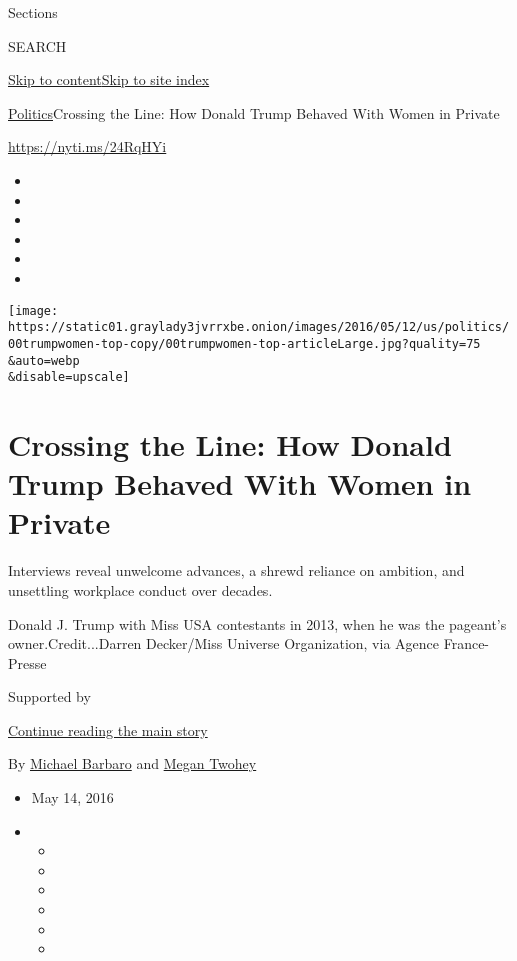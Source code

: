 Sections

SEARCH

\protect\hyperlink{site-content}{Skip to
content}\protect\hyperlink{site-index}{Skip to site index}

\href{/section/politics}{Politics}\textbar{}Crossing the Line: How
Donald Trump Behaved With Women in Private

\url{https://nyti.ms/24RqHYi}

\begin{itemize}
\item
\item
\item
\item
\item
\item
\end{itemize}

\texttt{[image: https://static01.graylady3jvrrxbe.onion/images/2016/05/12/us/politics/00trumpwomen-top-copy/00trumpwomen-top-articleLarge.jpg?quality=75\\\&auto=webp\\\&disable=upscale]}

\hypertarget{crossing-the-line-how-donald-trump-behaved-with-women-in-private}{%
\section{Crossing the Line: How Donald Trump Behaved With Women in
Private}\label{crossing-the-line-how-donald-trump-behaved-with-women-in-private}}

Interviews reveal unwelcome advances, a shrewd reliance on ambition, and
unsettling workplace conduct over decades.

Donald J. Trump with Miss USA contestants in 2013, when he was the
pageant's owner.Credit...Darren Decker/Miss Universe Organization, via
Agence France-Presse

Supported by

\protect\hyperlink{after-sponsor}{Continue reading the main story}

By \href{http://www.nytimes3xbfgragh.onion/by/michael-barbaro}{Michael
Barbaro} and
\href{https://www.nytimes3xbfgragh.onion/by/megan-twohey}{Megan Twohey}

\begin{itemize}
\item
  May 14, 2016
\item
  \begin{itemize}
  \item
  \item
  \item
  \item
  \item
  \item
  \end{itemize}
\end{itemize}


